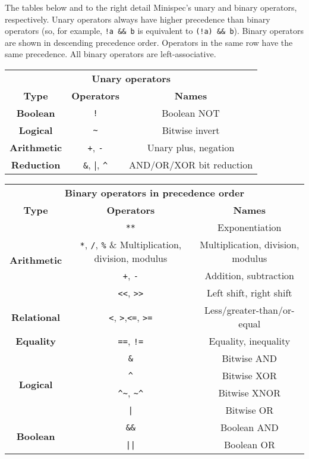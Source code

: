 \begin{minipage}[t]{0.45\columnwidth}

\vspace{-1.4in}
The tables below and to the right detail Minispec's unary and binary operators, respectively.
Unary operators always have higher precedence than binary operators
(so, for example, \verb|!a && b| is equivalent to \verb|(!a) && b|).
Binary operators are shown in descending precedence order.
Operators in the same row have the same precedence.
All binary operators are left-associative.
\\

\vspace{8.3pt}

\centering
\begin{tabular}{ccc}
  \toprule
  \multicolumn{3}{c}{\textbf{Unary operators}} \\
  \textbf{Type}    & \textbf{Operators} & \textbf{Names} \\
  \midrule
  \textbf{Boolean} & \verb|!| & Boolean NOT \\
  \midrule
  \textbf{Logical} & \verb|~| & Bitwise invert \\
  \midrule
  \textbf{Arithmetic} & \verb|+|, \verb|-| & Unary plus, negation \\
  \midrule
  \textbf{Reduction} & \verb|&|, \textbf{|}, \verb|^| & AND/OR/XOR bit reduction \\
  \bottomrule
\end{tabular}
\end{minipage}
\hfill
\begin{minipage}[t]{0.5\columnwidth}
  \centering
\begin{tabular}{ccc}
  \toprule
  \multicolumn{3}{c}{\textbf{Binary operators in precedence order}} \\
  \textbf{Type}    & \textbf{Operators} & \textbf{Names} \\
  \midrule
  \multirow{4}{*}{\textbf{Arithmetic}} & \verb|**| & Exponentiation \\
  & \verb|*|, \verb|/|, \verb|%| & Multiplication, division, modulus \\
  & \verb|+|, \verb|-| & Addition, subtraction \\
  & \verb|<<|, \verb|>>| & Left shift, right shift \\
  \midrule
  \textbf{Relational} & \verb|<|, \verb|>|,\verb|<=|, \verb|>=| & Less/greater-than/or-equal \\
  \midrule
  \textbf{Equality} & \verb|==|, \verb|!=| & Equality, inequality \\
  \midrule
  \multirow{4}{*}{\textbf{Logical}} & \verb|&| & Bitwise AND \\
  & \verb|^| & Bitwise XOR \\
  & \verb|^~|, \verb|~^| & Bitwise XNOR \\
  & \texttt{|} & Bitwise OR \\
  \midrule
  \multirow{2}{*}{\textbf{Boolean}} & \verb|&&| & Boolean AND \\
  & \texttt{||} & Boolean OR \\
  \bottomrule
\end{tabular}
\end{minipage}

